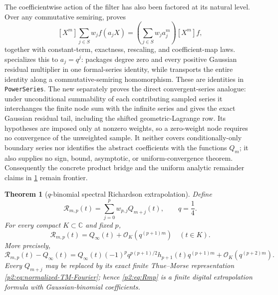\documentclass[11pt,oneside]{article}
\numberwithin{equation}{section}
\newtheorem{theorem}{Theorem}[section]
\theoremstyle{definition}
\theoremstyle{remark}
\newcommand{\C}{\mathbb C}
\newcommand{\bigO}{\mathcal O}
\begin{document}
The coefficientwise action of the filter has also been factored at its
natural level.  Over any commutative semiring,
 proves
\[
 [X^m]\sum_{j\in S}w_j f(a_jX)
 =\left(\sum_{j\in S}w_ja_j^m\right)[X^m]f,
\]
together with constant-term, exactness, rescaling, and coefficient-map laws.
 specializes this to \(a_j=q^j\):
 packages degree
zero and every positive Gaussian residual multiplier in one formal-series
identity, while  transports the entire
identity along a commutative-semiring homomorphism.  These are identities in
\texttt{PowerSeries}.  The new  separately
proves the direct convergent-series analogue: under unconditional summability
of each contributing sampled series it interchanges the finite node sum with
the infinite series and gives the exact Gaussian residual tail, including the
shifted geometric-Lagrange row.  Its hypotheses are imposed only at nonzero
weights, so a zero-weight node requires no convergence of the unweighted
sample.  It neither covers conditionally-only boundary series nor identifies
the abstract coefficients with the functions \(Q_m\); it also supplies no
sign, bound, asymptotic, or uniform-convergence theorem.  Consequently the
concrete product bridge and the uniform analytic remainder claims in
\cref{p2:thm:qRichardson} remain frontier.

\begin{theorem}[$q$-binomial spectral Richardson extrapolation]
\label{p2:thm:qRichardson}
Define
\begin{equation}
 \mathcal R_{m,p}(t)=\sum_{j=0}^{p}w_{p,j}Q_{m+j}(t),
 \qquad q=\frac14.
 \label{p2:eq:Rmp}
\end{equation}
For every compact $K\subset\C$ and fixed $p$,
\begin{equation}
 \boxed{
 \mathcal R_{m,p}(t)=Q_\infty(t)+\bigO_K(q^{(p+1)m})
 \quad(t\in K).}
 \label{p2:eq:Richardson-order}
\end{equation}
More precisely,
\begin{equation}
 \mathcal R_{m,p}(t)-Q_\infty(t)
 =Q_\infty(t)(-1)^pq^{p(p+1)/2}h_{p+1}(t)q^{(p+1)m}
 +\bigO_K(q^{(p+2)m}).
 \label{p2:eq:Richardson-leading}
\end{equation}
Every $Q_{m+j}$ may be replaced by its exact finite Thue--Morse representation
\eqref{p2:eq:normalized-TM-Fourier}; hence \eqref{p2:eq:Rmp} is a finite digital extrapolation
formula with Gaussian-binomial coefficients.
\newresult
\end{theorem}
\end{document}
